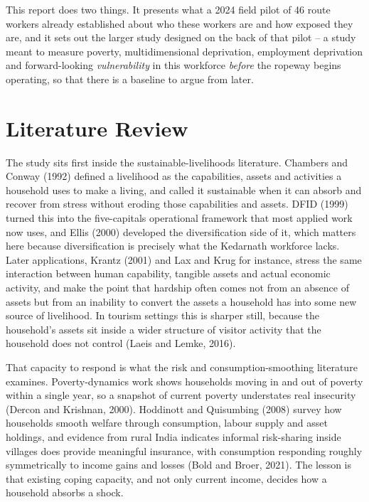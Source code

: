 \documentclass[11pt]{article}
\begin{document}
This report does two things. It presents what a 2024 field pilot of 46 route workers already
established about who these workers are and how exposed they are, and it sets out the larger
study designed on the back of that pilot -- a study meant to measure poverty, multidimensional
deprivation, employment deprivation and forward-looking \emph{vulnerability} in this
workforce \emph{before} the ropeway begins operating, so that there is a baseline to argue
from later.

\section{Literature Review}

The study sits first inside the sustainable-livelihoods literature. Chambers and Conway
(1992) defined a livelihood as the capabilities, assets and activities a household uses to
make a living, and called it sustainable when it can absorb and recover from stress without
eroding those capabilities and assets. DFID (1999) turned this into the five-capitals
operational framework that most applied work now uses, and Ellis (2000) developed the
diversification side of it, which matters here because diversification is precisely what the
Kedarnath workforce lacks. Later applications, Krantz (2001) and Lax and Krug for instance,
stress the same interaction between human capability, tangible assets and actual economic
activity, and make the point that hardship often comes not from an absence of assets but from
an inability to convert the assets a household has into some new source of livelihood. In
tourism settings this is sharper still, because the household's assets sit inside a wider
structure of visitor activity that the household does not control (Laeis and Lemke, 2016).

That capacity to respond is what the risk and consumption-smoothing literature examines.
Poverty-dynamics work shows households moving in and out of poverty within a single year, so
a snapshot of current poverty understates real insecurity (Dercon and Krishnan, 2000).
Hoddinott and Quisumbing (2008) survey how households smooth welfare through consumption,
labour supply and asset holdings, and evidence from rural India indicates informal
risk-sharing inside villages does provide meaningful insurance, with consumption responding
roughly symmetrically to income gains and losses (Bold and Broer, 2021). The lesson is that
existing coping capacity, and not only current income, decides how a household absorbs a
shock.
\end{document}
